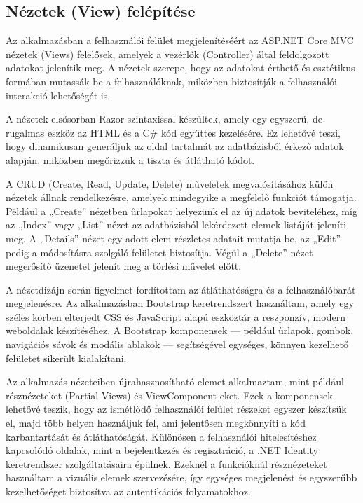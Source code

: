 \subsection{Nézetek (View) felépítése}

Az alkalmazásban a felhasználói felület megjelenítéséért az ASP.NET Core MVC nézetek (Views) felelősek, amelyek a vezérlők (Controller) által feldolgozott adatokat jelenítik meg. A nézetek szerepe, hogy az adatokat érthető és esztétikus formában mutassák be a felhasználóknak, miközben biztosítják a felhasználói interakció lehetőségét is.

A nézetek elsősorban Razor-szintaxissal készültek, amely egy egyszerű, de rugalmas eszköz az HTML és a C\# kód együttes kezelésére. Ez lehetővé teszi, hogy dinamikusan generáljuk az oldal tartalmát az adatbázisból érkező adatok alapján, miközben megőrizzük a tiszta és átlátható kódot.

A CRUD (Create, Read, Update, Delete) műveletek megvalósításához külön nézetek állnak rendelkezésre, amelyek mindegyike a megfelelő funkciót támogatja. Például a „Create” nézetben űrlapokat helyezünk el az új adatok beviteléhez, míg az „Index” vagy „List” nézet az adatbázisból lekérdezett elemek listáját jeleníti meg. A „Details” nézet egy adott elem részletes adatait mutatja be, az „Edit” pedig a módosításra szolgáló felületet biztosítja. Végül a „Delete” nézet megerősítő üzenetet jelenít meg a törlési művelet előtt.

A nézetdizájn során figyelmet fordítottam az átláthatóságra és a felhasználóbarát megjelenésre. Az alkalmazásban Bootstrap keretrendszert használtam, amely egy széles körben elterjedt CSS és JavaScript alapú eszköztár a reszponzív, modern weboldalak készítéséhez. A Bootstrap komponensek — például űrlapok, gombok, navigációs sávok és modális ablakok — segítségével egységes, könnyen kezelhető felületet sikerült kialakítani.

Az alkalmazás nézeteiben újrahasznosítható elemet alkalmaztam, mint például résznézeteket (Partial Views) és ViewComponent-eket. Ezek a komponensek lehetővé teszik, hogy az ismétlődő felhasználói felület részeket egyszer készítsük el, majd több helyen használjuk fel, ami jelentősen megkönnyíti a kód karbantartását és átláthatóságát. Különösen a felhasználói hitelesítéshez kapcsolódó oldalak, mint a bejelentkezés és regisztráció, a .NET Identity keretrendszer szolgáltatásaira épülnek. Ezeknél a funkcióknál résznézeteket használtam a vizuális elemek szervezésére, így egységes megjelenést és egyszerűbb kezelhetőséget biztosítva az autentikációs folyamatokhoz.

